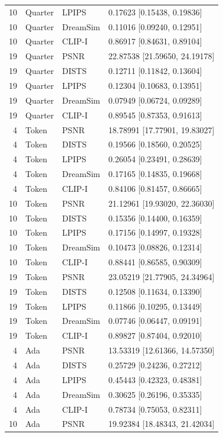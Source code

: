 \documentclass[10pt,letterpaper]{article}
\begin{document}
\begin{longtable}{@{}rlll@{}}
10 & Quarter & LPIPS & 0.17623 [0.15438, 0.19836]\\
10 & Quarter & DreamSim & 0.11016 [0.09240, 0.12951]\\
10 & Quarter & CLIP-I & 0.86917 [0.84631, 0.89104]\\
19 & Quarter & PSNR & 22.87538 [21.59650, 24.19178]\\
19 & Quarter & DISTS & 0.12711 [0.11842, 0.13604]\\
19 & Quarter & LPIPS & 0.12304 [0.10683, 0.13951]\\
19 & Quarter & DreamSim & 0.07949 [0.06724, 0.09289]\\
19 & Quarter & CLIP-I & 0.89545 [0.87353, 0.91613]\\
4 & Token & PSNR & 18.78991 [17.77901, 19.83027]\\
4 & Token & DISTS & 0.19566 [0.18560, 0.20525]\\
4 & Token & LPIPS & 0.26054 [0.23491, 0.28639]\\
4 & Token & DreamSim & 0.17165 [0.14835, 0.19668]\\
4 & Token & CLIP-I & 0.84106 [0.81457, 0.86665]\\
10 & Token & PSNR & 21.12961 [19.93020, 22.36030]\\
10 & Token & DISTS & 0.15356 [0.14400, 0.16359]\\
10 & Token & LPIPS & 0.17156 [0.14997, 0.19328]\\
10 & Token & DreamSim & 0.10473 [0.08826, 0.12314]\\
10 & Token & CLIP-I & 0.88441 [0.86585, 0.90309]\\
19 & Token & PSNR & 23.05219 [21.77905, 24.34964]\\
19 & Token & DISTS & 0.12508 [0.11634, 0.13390]\\
19 & Token & LPIPS & 0.11866 [0.10295, 0.13449]\\
19 & Token & DreamSim & 0.07746 [0.06447, 0.09191]\\
19 & Token & CLIP-I & 0.89827 [0.87404, 0.92010]\\
4 & Ada & PSNR & 13.53319 [12.61366, 14.57350]\\
4 & Ada & DISTS & 0.25729 [0.24236, 0.27212]\\
4 & Ada & LPIPS & 0.45443 [0.42323, 0.48381]\\
4 & Ada & DreamSim & 0.30625 [0.26196, 0.35335]\\
4 & Ada & CLIP-I & 0.78734 [0.75053, 0.82311]\\
10 & Ada & PSNR & 19.92384 [18.48343, 21.42034]\\

\end{longtable}
\end{document}
